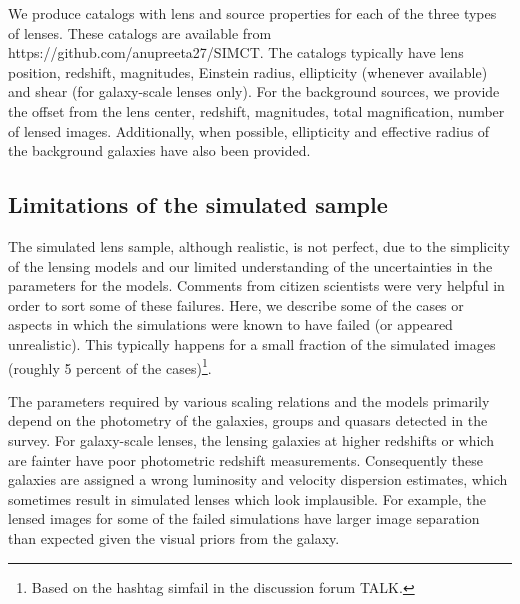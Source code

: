 \documentclass[useAMS,usenatbib,a4paper]{mn2e}
\begin{document}

We produce catalogs with lens and source properties for each of the three types
of lenses. These catalogs are available from
https://github.com/anupreeta27/SIMCT. The catalogs typically have lens
position, redshift, magnitudes, Einstein radius, ellipticity (whenever
available) and shear (for galaxy-scale lenses only). For the background
sources, we provide the offset from the lens center, redshift, magnitudes,
total magnification, number of lensed images. Additionally, when possible,
ellipticity and effective radius of the background galaxies have also been
provided.


\subsection{Limitations of the simulated sample}
The simulated lens sample, although realistic, is not perfect, due to the
simplicity of the lensing models and our limited understanding of the
uncertainties in the parameters for the models. Comments from citizen
scientists were very helpful in order to sort some of these failures. Here, we
describe some of the cases or aspects in which the simulations were known to
have failed (or appeared unrealistic). This typically happens for a small
fraction of the simulated images (roughly 5 percent of
the cases)\footnote{Based on the hashtag simfail in the discussion forum
TALK.}.

The parameters required by various scaling relations and the models primarily
depend on the photometry of the galaxies, groups and quasars detected in the
survey. For galaxy-scale lenses, the lensing galaxies at higher redshifts or
which are fainter have poor photometric redshift measurements. Consequently
these galaxies are assigned a wrong luminosity and velocity dispersion
estimates, which sometimes result in simulated lenses which look implausible.
For example, the lensed images for some of the failed simulations have larger
image separation than expected given the visual priors from the galaxy.
\end{document}
